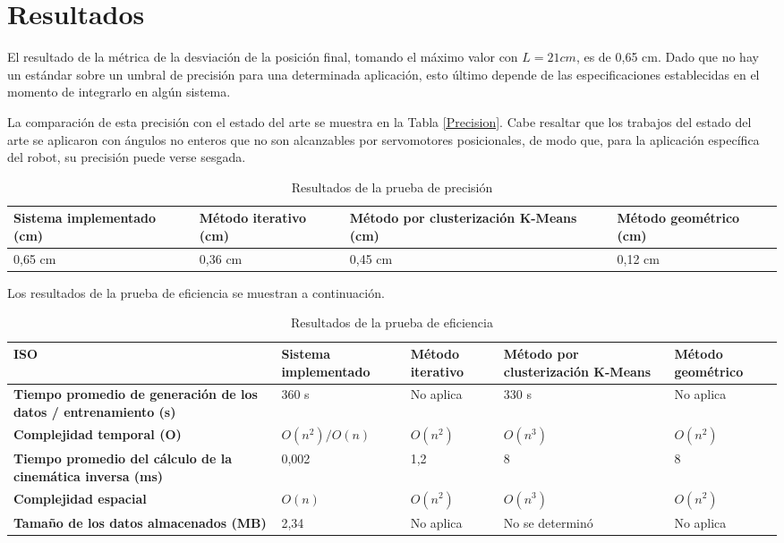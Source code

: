 \section{Resultados}

El resultado de la métrica de la desviación de la posición final, tomando el máximo valor con $L = 21 cm$, es de 0,65 cm. Dado que no hay un estándar sobre un umbral de precisión para una determinada aplicación, esto último depende de las especificaciones establecidas en el momento de integrarlo en algún sistema.

La comparación de esta precisión con el estado del arte se muestra en la Tabla \ref{Precision}. Cabe resaltar que los trabajos del estado del arte se aplicaron con ángulos no enteros que no son alcanzables por servomotores posicionales, de modo que, para la aplicación específica del robot, su precisión puede verse sesgada.

\begin{table}[ht]
	\centering
	\begin{tabular}{p{5cm}p{4cm}p{3.6cm}p{4cm}}
		\hline
		\textbf{Sistema implementado (cm)} & \textbf{Método iterativo (cm)} & \textbf{Método por clusterización K-Means (cm)} & \textbf{Método geométrico (cm)} \\
		\hline
		0,65 cm & 0,36 cm & 0,45 cm & 0,12 cm \\
		\hline
	\end{tabular}
	\caption{Resultados de la prueba de precisión}
	\label{tab:Precision}
\end{table}

Los resultados de la prueba de eficiencia se muestran a continuación.

\begin{table}[ht]
	\centering
	\begin{tabular}{p{3.2cm}p{3.2cm}p{3.2cm}p{3.2cm}p{3.2cm}}
		\hline
	    \textbf{ISO} & \textbf{Sistema implementado} & \textbf{Método iterativo} & \textbf{Método por clusterización K-Means} & \textbf{Método geométrico} \\
		\hline
		\textbf{Tiempo promedio de generación de los datos / entrenamiento (s)} & 360 s & No aplica & 330 s & No aplica \\
		\textbf{Complejidad temporal (O)} & $O(n^2)/O(n)$ & $O(n^2)$ & $O(n^3)$ & $O(n^2)$ \\
		\textbf{Tiempo promedio del cálculo de la cinemática inversa (ms)} & 0,002 & 1,2 & 8 & 8 \\
		\textbf{Complejidad espacial} & $O(n)$ & $O(n^2)$ & $O(n^3)$ & $O(n^2)$ \\
		\textbf{Tamaño de los datos almacenados (MB)} & 2,34 & No aplica & No se determinó & No aplica \\
		\hline
	\end{tabular}
	\caption{Resultados de la prueba de eficiencia}
	\label{tab:Precision}
\end{table}
